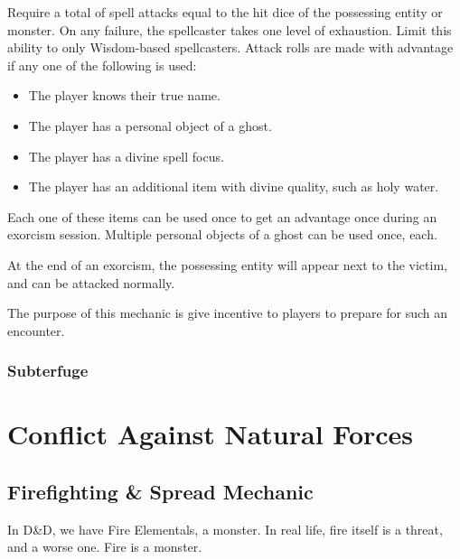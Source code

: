 \documentclass[twocolumn]{dndbook}
\begin{document}
Require a total of spell attacks equal to the hit dice of the possessing entity or monster.
On any failure, the spellcaster takes one level of exhaustion.
Limit this ability to only Wisdom-based spellcasters.
Attack rolls are made with advantage if any one of the following is used:
\begin{itemize}
	\item The player knows their true name.
	\item The player has a personal object of a ghost.
	\item The player has a divine spell focus.
	\item The player has an additional item with divine quality, such as holy water.
\end{itemize}

Each one of these items can be used once to get an advantage once during an exorcism session.
Multiple personal objects of a ghost can be used once, each.

At the end of an exorcism, the possessing entity will appear next to the victim, and can be attacked normally.\par

The purpose of this mechanic is give incentive to players to prepare for such an encounter.\par

\subsection{Subterfuge}


\chapter{Conflict Against Natural Forces}
\section{Firefighting \& Spread Mechanic}

In D\&D, we have Fire Elementals, a monster.
In real life, fire itself is a threat, and a worse one.
Fire is a monster.\par
\end{document}
